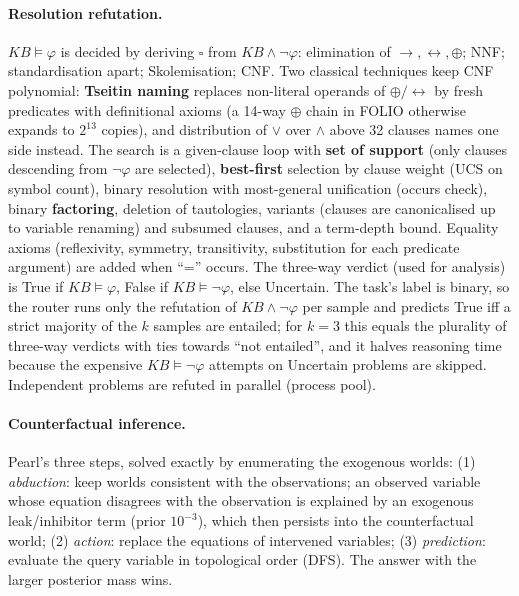 \documentclass[10pt,a4paper]{article}
\begin{document}
\paragraph{Resolution refutation.} $\mathit{KB}\models\varphi$ is decided by deriving $\square$ from $\mathit{KB}\wedge\neg\varphi$: elimination of $\rightarrow,\leftrightarrow,\oplus$; NNF; standardisation apart; Skolemisation; CNF. Two classical techniques keep CNF polynomial: \textbf{Tseitin naming} replaces non-literal operands of $\oplus/\leftrightarrow$ by fresh predicates with definitional axioms (a 14-way $\oplus$ chain in FOLIO otherwise expands to $2^{13}$ copies), and distribution of $\vee$ over $\wedge$ above 32 clauses names one side instead. The search is a given-clause loop with \textbf{set of support} (only clauses descending from $\neg\varphi$ are selected), \textbf{best-first} selection by clause weight (UCS on symbol count), binary resolution with most-general unification (occurs check), binary \textbf{factoring}, deletion of tautologies, variants (clauses are canonicalised up to variable renaming) and subsumed clauses, and a term-depth bound. Equality axioms (reflexivity, symmetry, transitivity, substitution for each predicate argument) are added when ``='' occurs. The three-way verdict (used for analysis) is True if $\mathit{KB}\models\varphi$, False if $\mathit{KB}\models\neg\varphi$, else Uncertain. The task's label is binary, so the router runs only the refutation of $\mathit{KB}\wedge\neg\varphi$ per sample and predicts True iff a strict majority of the $k$ samples are entailed; for $k{=}3$ this equals the plurality of three-way verdicts with ties towards ``not entailed'', and it halves reasoning time because the expensive $\mathit{KB}\models\neg\varphi$ attempts on Uncertain problems are skipped. Independent problems are refuted in parallel (process pool).

\paragraph{Counterfactual inference.} Pearl's three steps, solved exactly by enumerating the exogenous worlds: (1) \emph{abduction}: keep worlds consistent with the observations; an observed variable whose equation disagrees with the observation is explained by an exogenous leak/inhibitor term (prior $10^{-3}$), which then persists into the counterfactual world; (2) \emph{action}: replace the equations of intervened variables; (3) \emph{prediction}: evaluate the query variable in topological order (DFS). The answer with the larger posterior mass wins.
\end{document}
